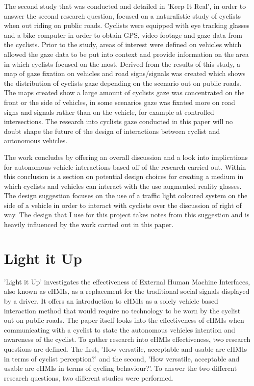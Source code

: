 \documentclass{l4proj}
\begin{document}
The second study that was conducted and detailed in 'Keep It Real', in order to answer the second research question, focused on a naturalistic study of cyclists when out riding on public roads. Cyclists were equipped with eye tracking glasses and a bike computer in order to obtain GPS, video footage and gaze data from the cyclists. Prior to the study, areas of interest were defined on vehicles which allowed the gaze data to be put into context and provide information on the area in which cyclists focused on the most. Derived from the results of this study, a map of gaze fixation on vehicles and road signs/signals was created which shows the distribution of cyclists gaze depending on the scenario out on public roads. The maps created show a large amount of cyclists gaze was concentrated on the front or the side of vehicles, in some scenarios gaze was fixated more on road signs and signals rather than on the vehicle, for example at controlled intersections. The research into cyclists gaze conducted in this paper will no doubt shape the future of the design of interactions between cyclist and autonomous vehicles.

The work concludes by offering an overall discussion and a look into implications for autonomous vehicle interactions based off of the research carried out. Within this conclusion is a section on potential design choices for creating a medium in which cyclists and vehicles can interact with the use augmented reality glasses. The design suggestion focuses on the use of a traffic light coloured system on the side of a vehicle in order to interact with cyclists over the discussion of right of way. The design that I use for this project takes notes from this suggestion and is heavily influenced by the work carried out in this paper.

\section{Light it Up \citep{light_it_up}}

'Light it Up' investigates the effectiveness of External Human Machine Interfaces, also known as eHMIs, as a replacement for the traditional social signals displayed by a driver. It offers an introduction to eHMIs as a solely vehicle based interaction method that would require no technology to be worn by the cyclist out on public roads. The paper itself looks into the effectiveness of eHMIs when communicating with a cyclist to state the autonomous vehicles intention and awareness of the cyclist. To gather research into eHMIs effectiveness, two research questions are defined. The first, 'How versatile, acceptable and usable are eHMIs in terms of cyclist perception?' and the second, 'How versatile, acceptable and usable are eHMIs in terms of cycling behaviour?'. To answer the two different research questions, two different studies were performed.
\end{document}
